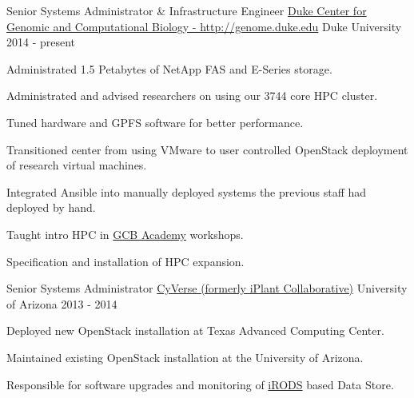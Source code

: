 

\begin{cventries}

  \cventry
    {Senior Systems Administrator \& Infrastructure Engineer} %
    {\href{http://genome.duke.edu}{Duke Center for Genomic and Computational Biology - http://genome.duke.edu}} %
    {Duke University} %
    {2014 - present} %
    {
      \begin{cvitems} %
        \item {Administrated 1.5 Petabytes of NetApp FAS and E-Series storage.}
        \item {Administrated and advised researchers on using our 3744 core HPC cluster.}
        \item {Tuned hardware and GPFS software for better performance.}
        \item {Transitioned center from using VMware to user controlled OpenStack deployment of research virtual machines.}
        \item {Integrated Ansible into manually deployed systems the previous staff had deployed by hand.}
        \item {Taught intro HPC in \href{http://genome.duke.edu/gcb-academy}{GCB Academy} workshops.}
        \item {Specification and installation of HPC expansion.}
      \end{cvitems}
    }

  \cventry
    {Senior Systems Administrator} %
    {\href{http://cyverse.org/}{CyVerse (formerly iPlant Collaborative)}} %
    {University of Arizona} %
    {2013 - 2014} %
    {
      \begin{cvitems} %
        \item {Deployed new OpenStack installation at Texas Advanced Computing Center.}
        \item {Maintained existing OpenStack installation at the University of Arizona.}
        \item {Responsible for software upgrades and monitoring of \href{http://irods.org/}{iRODS} based Data Store.}
      \end{cvitems}
    }


\end{cventries}
